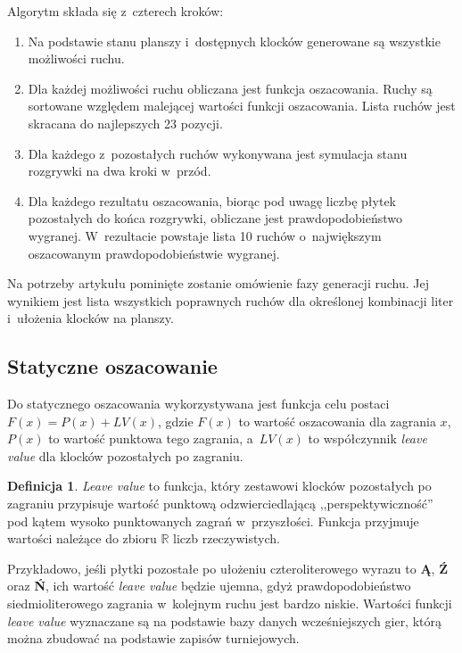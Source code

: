 \documentclass[a4paper,twocolumn,12pt]{article}
\theoremstyle{definition}
\newtheorem{definition}{Definicja}
\begin{document}
Algorytm składa się z~czterech kroków:

\begin{enumerate}
	\item Na podstawie stanu planszy i~dostępnych klocków generowane są wszystkie możliwości ruchu.
	\item Dla każdej możliwości ruchu obliczana jest funkcja oszacowania. Ruchy są sortowane względem malejącej wartości funkcji oszacowania. Lista ruchów jest skracana do najlepszych 23 pozycji.
	\item Dla każdego z~pozostałych ruchów wykonywana jest symulacja stanu rozgrywki na dwa kroki w~przód.
	\item Dla każdego rezultatu oszacowania, biorąc pod uwagę liczbę płytek pozostałych do końca rozgrywki, obliczane jest prawdopodobieństwo wygranej. W~rezultacie powstaje lista 10 ruchów o~największym oszacowanym prawdopodobieństwie wygranej.
\end{enumerate}

Na potrzeby artykułu pominięte zostanie omówienie fazy generacji ruchu. Jej wynikiem jest lista wszystkich poprawnych ruchów dla określonej kombinacji liter i~ułożenia klocków na planszy.

\subsection*{Statyczne oszacowanie}

Do statycznego oszacowania wykorzystywana jest funkcja celu postaci $F(x) = P(x) + LV(x)$, gdzie $F(x)$ to wartość oszacowania dla zagrania $x$, $P(x)$ to wartość punktowa tego zagrania, a~$LV(x)$ to współczynnik \emph{leave value} dla klocków pozostałych po zagraniu.

\begin{definition}
	\emph{Leave value} to funkcja, który zestawowi klocków pozostałych po zagraniu przypisuje wartość punktową odzwierciedlającą ,,perspektywiczność'' pod kątem wysoko punktowanych zagrań w~przyszłości. Funkcja przyjmuje wartości należące do zbioru $\mathbb{R}$ liczb rzeczywistych.
\end{definition}

Przykładowo, jeśli płytki pozostałe po ułożeniu czteroliterowego wyrazu to \textbf{Ą}, \textbf{Ź} oraz \textbf{Ń}, ich wartość \emph{leave value} będzie ujemna, gdyż prawdopodobieństwo siedmioliterowego zagrania w~kolejnym ruchu jest bardzo niskie. Wartości funkcji \emph{leave value} wyznaczane są na podstawie bazy danych wcześniejszych gier, którą można zbudować na podstawie zapisów turniejowych. 
\end{document}

